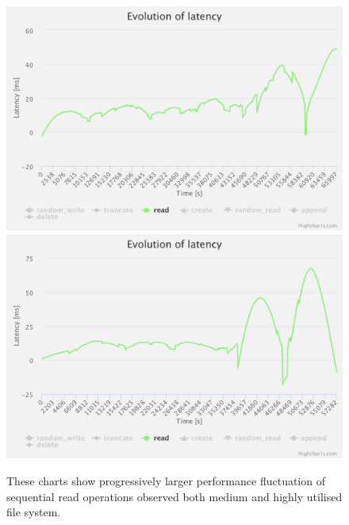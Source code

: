 \documentclass[
  color, %
  table, %
  lof,   %
  lot,   %
]{fithesis3}
\begin{document}
\begin{figure}[!htb]
    \centering
   \begin{minipage}{\textwidth}
        \centering
        \includegraphics[width=\textwidth]{../charts/HDD_xfs/read_high}
        \includegraphics[width=\textwidth]{../charts/HDD_xfs/read_low}
        \caption[Evolution of sequential read of XFS during testing of high and medium utilisation of HDD]{These charts show progressively larger performance fluctuation of sequential read operations observed both medium and highly utilised file system.}
\label{fig:read_lh}
    \end{minipage}
\end{figure}

\clearpage
\end{document}
